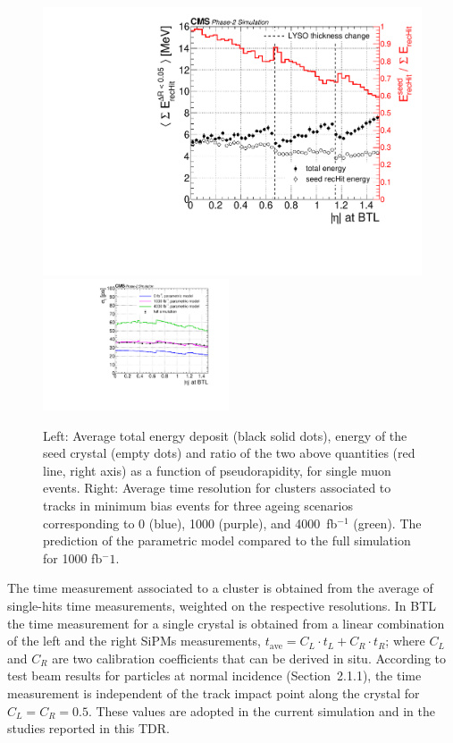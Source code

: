 \begin{figure}[hbtp]
\centering
\includegraphics[width=0.49\linewidth]{fig/performance/c_singleMuPtFlat_maxEnergy_vs_eta.pdf}
\includegraphics[width=0.49\textwidth]{fig/performance/c_MinBias_timeRes_vs_eta.pdf}
\caption{Left: Average total energy deposit (black solid dots), energy of the seed crystal (empty dots) and ratio of the two above quantities (red line, right axis) as a function of pseudorapidity, for single muon events. Right: Average time resolution for clusters associated to tracks in minimum bias events for three ageing scenarios corresponding to 0 (blue), 1000 (purple), and 4000~fb$^{-1}$ (green). The prediction of the parametric model compared to the full simulation for 1000 fb$^-1$.
}
\label{fig:BTL_EdepVsEta_timeRes}
\end{figure}



The time measurement associated to a cluster is obtained
from the average of single-hits time measurements, weighted on the
respective resolutions.  In BTL the time measurement for a single crystal is
obtained from a linear combination of the left and the right SiPMs
measurements, $t_{\text{ave}} = C_{L} \cdot t_{L} + C_{R} \cdot t_{R }$; where $C_{L}$
and $C_{R}$ are two calibration coefficients that can be  
derived in situ. According to test beam results for particles at
normal incidence (Section~2.1.1), the time measurement is independent
of the track impact point along the crystal for $C_{L} = C_{R} = 0.5$.  
These values are adopted in the current simulation and in the studies
reported in this TDR.  

